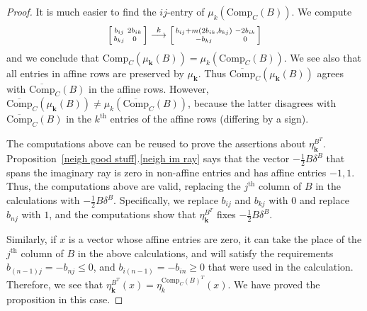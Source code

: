 \documentclass{amsart}
\theoremstyle{definition}
\theoremstyle{remark}
\numberwithin{equation}{section}
\newcommand{\set}[1]{{\lbrace #1 \rbrace}}
\renewcommand{\th}{^\text{th}}
\newcommand{\0}{{\mathbf{0}}}
\newcommand{\Comp}{\mathrm{Comp}_C}
\newcommand{\CompPlus}{\overline{\mathrm{Comp}}_C}
\newcommand{\kk}{{\boldsymbol{k}}}
\renewcommand{\th}{^\text{th}}
\begin{document}
\begin{proof}
It is much easier to find the $ij$-entry of $\mu_k(\Comp(B))$.
We compute
\[
\begin{bsmallmatrix*}
b_{ij}&2b_{ik}\\
b_{kj}&0
\end{bsmallmatrix*}
\overset{k}{\longrightarrow}
\begin{bsmallmatrix*}
b_{ij}+m(2b_{ik},b_{kj})&-2b_{ik}\\
-b_{kj}&0
\end{bsmallmatrix*}
\]
and we conclude that $\Comp(\mu_\kk(B))=\mu_k(\Comp(B))$.
We see also that all entries in affine rows are preserved by $\mu_\kk$.
Thus $\CompPlus(\mu_\kk(B))$ agrees with $\CompPlus(B)$ in the affine rows.
However, $\CompPlus(\mu_\kk(B))\neq\mu_k(\CompPlus(B))$, because the latter disagrees with $\CompPlus(B)$ in the $k\th$ entries of the affine rows (differing by a sign).

The computations above can be reused to prove the assertions about $\eta^{B^T}_\kk$.
Proposition~\ref{neigh good stuff}.\ref{neigh im ray} says that the vector $-\frac12B\delta^B$ that spans the imaginary ray is zero in non-affine entries and has affine entries $-1,1$.
Thus, the computations above are valid, replacing the $j\th$ column of $B$ in the calculations with $-\frac12B\delta^B$.
Specifically, we replace $b_{ij}$ and $b_{kj}$ with $0$ and replace $b_{nj}$ with $1$, and the computations show that $\eta^{B^T}_\kk$ fixes $-\frac12B\delta^B$.

Similarly, if $x$ is a vector whose affine entries are zero, it can take the place of the $j\th$ column of $B$ in the above calculations, and will satisfy the requirements $b_{(n-1)j}=-b_{nj}\le0$, and $b_{i(n-1)}=-b_{in}\ge0$ that were used in the calculation.  
Therefore, we see that $\eta^{B^T}_\kk(x)=\eta^{\Comp(B)^T}_k(x)$.
We have proved the proposition in this case.

\medskip


\end{proof}
\end{document}
